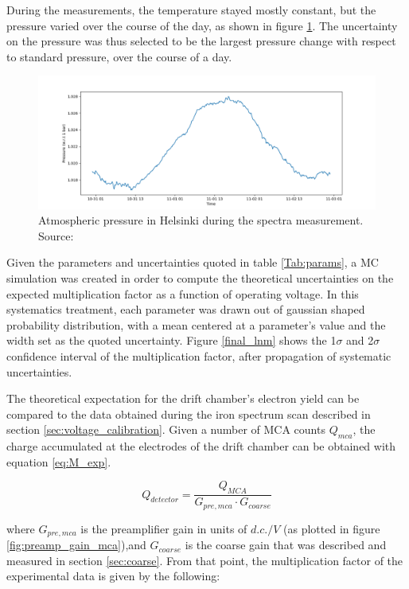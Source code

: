 During the measurements, the temperature stayed mostly constant, but the pressure varied over the course of the day, as shown in figure \ref{fig:pressure}. The uncertainty on the pressure was thus selected to be the largest pressure change with respect to standard pressure, over the course of a day.

\begin{figure}[htb]
  \includegraphics[width=\textwidth]{graphics/pressure_monitoring.png}
  \caption{Atmospheric pressure in Helsinki during the spectra measurement. Source: \cite{meteo}}
  \label{fig:pressure}
\end{figure}

Given the parameters and uncertainties quoted in table \ref{Tab:params}, a MC simulation was created in order to compute the theoretical uncertainties on the expected multiplication factor as a function of operating voltage. In this systematics treatment, each parameter was drawn out of gaussian shaped probability distribution, with a mean centered at a parameter's value and the width set as the quoted uncertainty. Figure \ref{final_lnm} shows the 1$\sigma$ and 2$\sigma$ confidence interval of the multiplication factor, after propagation of systematic uncertainties.

The theoretical expectation for the drift chamber's electron yield can be compared to the data obtained during the iron spectrum scan described in section \ref{sec:voltage_calibration}. Given a number of MCA counts $Q_{mca}$, the charge accumulated at the electrodes of the drift chamber can be obtained with equation \ref{eq:M_exp}.

\begin{equation}
  \label{eq:M_exp}
  Q_{detector} = \frac{Q_{MCA}}{G_{pre,mca}\cdot{G_{coarse}}}
\end{equation}

where $G_{pre,mca}$ is the preamplifier gain in units of $d.c./V$ (as plotted in figure \ref{fig:preamp_gain_mca}),and $G_{coarse}$ is the coarse gain that was described and measured in section \ref{sec:coarse}. From that point, the multiplication factor of the experimental data is given by the following:

